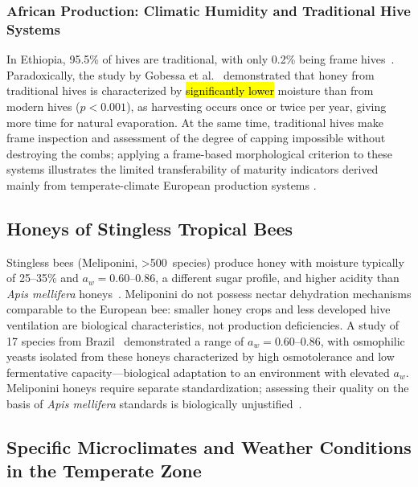 \documentclass[foods,review,accept,pdftex,moreauthors]{Definitions/mdpi}
\begin{document}
{\subsubsection*{African Production: Climatic Humidity and Traditional Hive Systems}

In Ethiopia, 95.5\% of hives are traditional, with only 0.2\%
being frame hives~\cite{ethaau2007}. Paradoxically, the study
by Gobessa et al.~\cite{sciendo2012} demonstrated that honey
from traditional hives is characterized by \hl{significantly
lower} moisture than from modern hives ($p < 0.001$), as
harvesting occurs once or twice per year, giving more time
for natural evaporation. At the same time, traditional hives
make frame inspection and assessment of the degree of capping
impossible without destroying the combs; applying a frame-based morphological criterion to these systems illustrates the limited transferability of maturity indicators derived mainly from temperate-climate European production systems \cite{tadele2025}.


\subsection{Honeys of Stingless Tropical Bees}


Stingless bees (Meliponini, >500~species) produce honey with
moisture typically of 25--35\% and $a_w = 0.60$--$0.86$,
a different sugar profile, and higher acidity than
\textit{Apis mellifera} honeys~\cite{stinglessyeastbrazil2021,stinglesswjava2024}.
Meliponini do not possess nectar dehydration mechanisms
comparable to the European bee: smaller honey crops and less
developed hive ventilation are biological characteristics,
not production deficiencies. A study of 17 species
from Brazil~\cite{stinglessyeastbrazil2021} demonstrated a range
of $a_w = 0.60$--$0.86$, with osmophilic yeasts isolated
from these honeys characterized by high osmotolerance and low
fermentative capacity---biological adaptation to an environment
with elevated $a_w$. Meliponini honeys require separate
standardization; assessing their quality on the basis of
\textit{Apis mellifera} standards is biologically
unjustified~\cite{stinglessyeastbrazil2021,stinglesswjava2024}.


\subsection{Specific Microclimates and Weather Conditions in the Temperate Zone}

}
\end{document}

